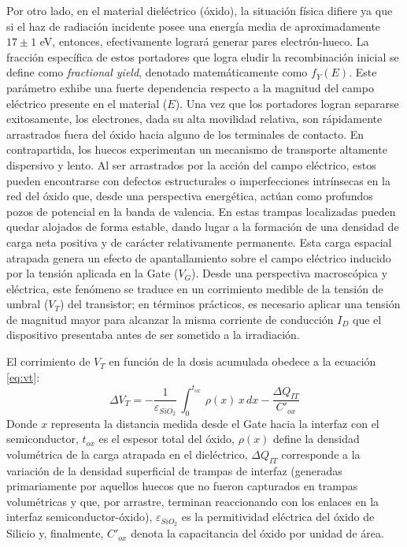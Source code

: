\documentclass[12pt,a4paper,oneside]{book}
\begin{document}
Por otro lado, en el material dieléctrico (óxido), la situación física difiere ya que si el haz de radiación incidente posee una energía media de aproximadamente $17 \pm 1$ eV, entonces, efectivamente logrará generar pares electrón-hueco. La fracción específica de estos portadores que logra eludir la recombinación inicial se define como \textit{fractional yield}, denotado matemáticamente como $f_Y(E)$. Este parámetro exhibe una fuerte dependencia respecto a la magnitud del campo eléctrico presente en el material ($E$). Una vez que los portadores logran separarse exitosamente, los electrones, dada su alta movilidad relativa, son rápidamente arrastrados fuera del óxido hacia alguno de los terminales de contacto. En contrapartida, los huecos experimentan un mecanismo de transporte altamente dispersivo y lento. Al ser arrastrados por la acción del campo eléctrico, estos pueden encontrarse con defectos estructurales o imperfecciones intrínsecas en la red del óxido que, desde una perspectiva energética, actúan como profundos pozos de potencial en la banda de valencia. En estas trampas localizadas pueden quedar alojados de forma estable, dando lugar a la formación de una densidad de carga neta positiva y de carácter relativamente permanente. Esta carga espacial atrapada genera un efecto de apantallamiento sobre el campo eléctrico inducido por la tensión aplicada en la Gate ($V_G$). Desde una perspectiva macroscópica y eléctrica, este fenómeno se traduce en un corrimiento medible de la tensión de umbral ($V_T$) del transistor; en términos prácticos, es necesario aplicar una tensión de magnitud mayor para alcanzar la misma corriente de conducción $I_D$ que el dispositivo presentaba antes de ser sometido a la irradiación.

El corrimiento de $V_T$ en función de la dosis acumulada obedece a la ecuación \eqref{eq:vt}:
\begin{equation}
\Delta V_T = - \frac{1}{\varepsilon_{SiO_2}}\,\int_0^{t_{ox}}\,\rho (x)\,x\,dx-\frac{\Delta Q_{IT}}{C'_{ox}}
\label{eq:vt}
\end{equation}
Donde $x$ representa la distancia medida desde el Gate hacia la interfaz con el semiconductor, $t_{ox}$ es el espesor total del óxido, $\rho(x)$ define la densidad volumétrica de la carga atrapada en el dieléctrico, $\Delta Q_{IT}$ corresponde a la variación de la densidad superficial de trampas de interfaz (generadas primariamente por aquellos huecos que no fueron capturados en trampas volumétricas y que, por arrastre, terminan reaccionando con los enlaces en la interfaz semiconductor-óxido), $\varepsilon_{SiO_2}$ es la permitividad eléctrica del óxido de Silicio y, finalmente, $C'_{ox}$ denota la capacitancia del óxido por unidad de área.
\end{document}
